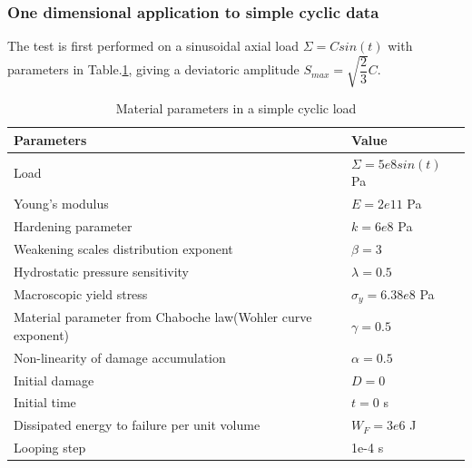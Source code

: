 \documentclass[3p,times,procedia,number]{elsarticle}
\begin{document}
\subsubsection{One dimensional application to simple cyclic data}
The test is first performed on a sinusoidal axial load $\Sigma=Csin(t)$ with parameters in Table.\ref{Sin}, giving a deviatoric amplitude $S_{max}=\sqrt{\dfrac{2}{3}}C$.
\begin{table}[!h]
	\centering
	\begin{tabular}{ll}
		\hline
		\textbf{Parameters}                                         & \textbf{Value}                    \\ \hline
		Load                                                              & $\Sigma=5e8sin(t)$ Pa                  \\
		Young's modulus                                             & $E=2e11$ Pa                       \\
		Hardening parameter                                         &  $k=6e8$ Pa \\
		Weakening scales distribution exponent                      & $\beta=3$                             \\
		Hydrostatic pressure sensitivity                            & $\lambda=0.5$                     \\
		Macroscopic yield stress                                    & $\sigma_y=6.38e8$ Pa              \\
		Material parameter from Chaboche law(Wohler curve exponent) & $\gamma=0.5$                        \\
		Non-linearity of damage accumulation & $\alpha=0.5$                        \\
		Initial damage                                              & $D=0$                          \\
		Initial time                                                & $t=0$ s                            \\
		Dissipated energy to failure per unit volume                & $W_F=3e6$ J                       \\
		Looping step                                           & 1e-4 s              \\ \hline
	\end{tabular}
	\caption{Material parameters in a simple cyclic load }
	\label{Sin}
\end{table}
\end{document}
